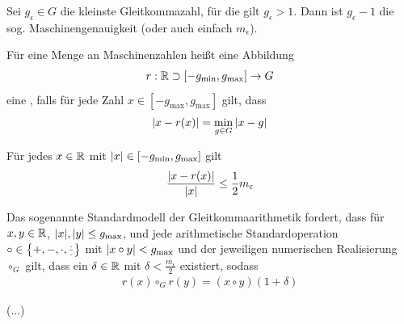 \documentclass{report}
\begin{document}
	\begin{definition}
		Sei $g_\epsilon \in G$ die kleinste Gleitkommazahl, für die gilt $g_\epsilon > 1$. Dann ist $g_\epsilon - 1$ die sog. Maschinengenauigkeit (oder auch einfach  $m_\epsilon$).
	\end{definition}
	\begin{definition}
		Für eine Menge an Maschinenzahlen heißt eine Abbildung
		\begin{align*}
			r : \mathbb{R} \supset [-g_{\min},g_{\max}] \to G
		\end{align*}
		eine , falls für jede Zahl $x \in [-g_{\max}, g_{\max}]$ gilt, dass
		\begin{align*}
			\abs{x - r(x)} = \min_{g \in G} \abs{x - g}
		\end{align*}
	\end{definition}
	\begin{lemma}
		Für jedes $x \in \mathbb{R}$ mit $\abs{x} \in [-g_{\min}, g_{\max}]$ gilt
		$$\frac{\abs{x-r(x)}}{\abs{x}} \leq \frac{1}{2}m_\varepsilon$$
	\end{lemma}
	\begin{definition}
		Das sogenannte Standardmodell der Gleitkommaarithmetik fordert, dass für $x,y \in \mathbb{R}$, $\abs{x}, \abs{y} \leq g_{\max}$, und jede arithmetische Standardoperation $\circ \in \qty{+,-,\cdot,\frac{\cdot}{\cdot}}$ mit $\abs{x \circ y} < g_{\max}$ und der jeweiligen numerischen Realisierung $\circ_G$ gilt, dass ein $\delta \in \mathbb{R}$ mit $\delta < \frac{m_\epsilon}{2}$ existiert, sodass
		\begin{align*}
			r(x) \circ_G r(y) = (x \circ y)(1 + \delta)
		\end{align*}
	\end{definition}
	(...)
	
\end{document}
